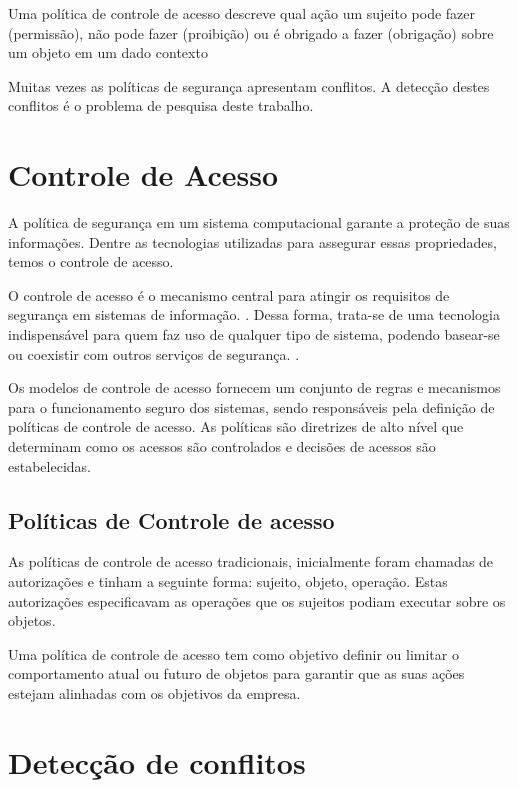 Uma política de controle de acesso descreve qual  ação um sujeito pode fazer (permissão), não pode fazer (proibição) ou é obrigado a fazer (obrigação) sobre um objeto em um dado contexto\cite{sarkis2017}

Muitas vezes as políticas de segurança apresentam conflitos. A detecção destes conflitos é o problema de pesquisa deste trabalho.


\section{Controle de Acesso} \label{controle_acesso}
A política de segurança em um sistema computacional garante a proteção de suas informações. Dentre as tecnologias utilizadas para assegurar essas propriedades, temos o controle de acesso. \cite{sarkis:artigo:2016}

O controle de acesso é o mecanismo central para atingir os requisitos de segurança em  sistemas  de  informação. \cite{wang_conflicts_2010}. Dessa forma,  trata-se  de  uma  tecnologia indispensável para quem faz uso de qualquer tipo de sistema, podendo basear-se ou coexistir com outros serviços de segurança. \cite{sandhu:1996}.

Os modelos de controle de acesso fornecem um conjunto de regras e mecanismos para o funcionamento seguro dos sistemas, sendo responsáveis pela definição de políticas de controle de acesso. As políticas são diretrizes de alto nível que determinam como os acessos são controlados e decisões de acessos são estabelecidas. \cite{di_vimercati_policies_2005} \cite{sarkis2017}	


\subsection{Políticas de Controle de acesso}
As políticas de controle de acesso tradicionais, inicialmente foram chamadas de autorizações e tinham a seguinte forma: {sujeito, objeto, operação}. Estas autorizações especificavam as operações que os sujeitos podiam executar sobre os objetos. \cite{di_vimercati_policies_2005}\cite{sarkis2017}

Uma política de controle de acesso tem como objetivo definir ou limitar o comportamento atual ou futuro de objetos para garantir que as suas ações estejam alinhadas com os objetivos da empresa.\cite{dunlop_dynamic_2002}\cite{sarkis2017}


\section{Detecção de conflitos} \label{deteccao_conflitos}

